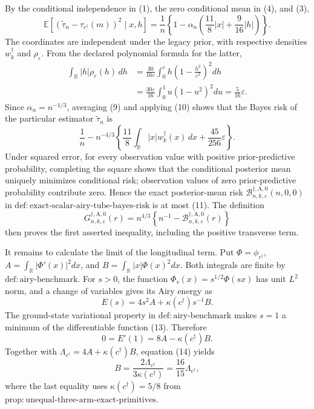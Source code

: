 By the conditional independence in (1), the zero conditional mean in (4), and (3),
\[
\mathbb E\!\left[
(\widetilde\tau_n-\tau_{c^\dagger}(m))^2\mid x,h\right]
=\frac1n\left\{1-\alpha_n\left(
\frac{11}{8}|x|+\frac9{16}|h|\right)\right\}.
\tag{9}
\]
The coordinates are independent under the legacy prior, with respective densities
\(w_k^\dagger\) and \(\rho_\varepsilon\).  From the declared polynomial formula for the latter,
\[
\begin{aligned}
\int_{\mathbb R}|h|\rho_\varepsilon(h)\,dh
&=\frac{30}{16\varepsilon}\int_0^\varepsilon
h\left(1-\frac{h^2}{\varepsilon^2}\right)^2dh\\
&=\frac{30\varepsilon}{16}\int_0^1u(1-u^2)^2du
=\frac5{16}\varepsilon.
\end{aligned}
\tag{10}
\]
Since \(\alpha_n=n^{-1/3}\), averaging (9) and applying (10) shows that the Bayes risk of the particular estimator \(\widetilde\tau_n\) is
\[
\frac1n-n^{-4/3}\left\{
\frac{11}{8}\int_{\mathbb R}|x|w_k^\dagger(x)\,dx
+\frac{45}{256}\varepsilon\right\}.
\tag{11}
\]
Under squared error, for every observation value with positive prior-predictive probability, completing the square shows that the conditional posterior mean uniquely minimizes conditional risk; observation values of zero prior-predictive probability contribute zero.  Hence the exact posterior-mean risk
\(\mathcal B_{n,k,\varepsilon}^{\dagger,\mathrm A,0}(n,0,0)\) in
\(\mathrm{def:exact\text{-}scalar\text{-}airy\text{-}tube\text{-}bayes\text{-}risk}\) is at most (11).  The definition
\[
G_{n,k,\varepsilon}^{\dagger,\mathrm A,0}(r)
=n^{4/3}\left\{n^{-1}-
\mathcal B_{n,k,\varepsilon}^{\dagger,\mathrm A,0}(r)\right\}
\tag{12}
\]
then proves the first asserted inequality, including the positive transverse term.

It remains to calculate the limit of the longitudinal term.  Put
\(\Phi=\phi_{c^\dagger}\),
\(A=\int_{\mathbb R}|\Phi'(x)|^2dx\), and
\(B=\int_{\mathbb R}|x|\Phi(x)^2dx\).  Both integrals are finite by
\(\mathrm{def:airy\text{-}benchmark}\).  For \(s>0\), the function
\(\Phi_s(x)=s^{1/2}\Phi(sx)\) has unit \(L^2\) norm, and a change of variables gives its Airy energy as
\[
E(s)=4s^2A+\kappa(c^\dagger)s^{-1}B.
\tag{13}
\]
The ground-state variational property in
\(\mathrm{def:airy\text{-}benchmark}\) makes \(s=1\) a minimum of the differentiable function (13).  Therefore
\[
0=E'(1)=8A-\kappa(c^\dagger)B.
\tag{14}
\]
Together with
\(\Lambda_{c^\dagger}=4A+\kappa(c^\dagger)B\), equation (14) yields
\[
B=\frac{2\Lambda_{c^\dagger}}
        {3\kappa(c^\dagger)}
=\frac{16}{15}\Lambda_{c^\dagger},
\tag{15}
\]
where the last equality uses
\(\kappa(c^\dagger)=5/8\) from
\(\mathrm{prop:unequal\text{-}three\text{-}arm\text{-}exact\text{-}primitives}\).

